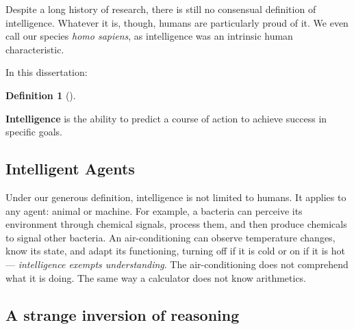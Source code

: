 \documentclass[
  letterpaper,
  12pt,
  british]{tufte-book}
\theoremstyle{plain}
\theoremstyle{definition}
\newtheorem{definition}{Definition}[chapter]
\theoremstyle{plain}
\theoremstyle{remark}
\begin{document}
Despite a long history of research, there is still no consensual
definition of intelligence. Whatever
it is, though, humans are particularly proud of it. We even call our
species \emph{homo sapiens}, as intelligence was an intrinsic human
characteristic.

In this dissertation:

\leavevmode{}%
\begin{definition}[]\label{def-intelligence}

\textbf{Intelligence} is the ability to predict a course of action to
achieve success in specific goals.

\end{definition}

\hypertarget{intelligent-agents}{%
\subsection{Intelligent Agents}\label{intelligent-agents}}

Under our generous definition, intelligence is not limited to humans. It
applies to any agent: animal or machine. For example, a
bacteria can perceive its environment through chemical signals, process
them, and then produce chemicals to signal other bacteria. An
air-conditioning can observe temperature changes, know its state, and
adapt its functioning, turning off if it is cold or on if it is hot ---
\emph{intelligence exempts understanding}. The air-conditioning does not
comprehend what it is doing. The same way a calculator does not know
arithmetics.

\hypertarget{sec-turing_strange_inversion}{%
\subsection{A strange inversion of
reasoning}\label{sec-turing_strange_inversion}}
\end{document}
